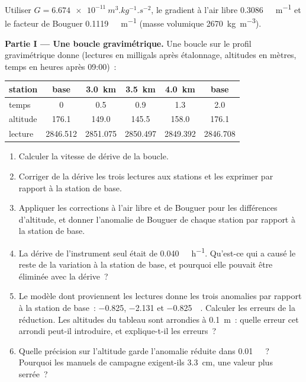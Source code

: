 \begin{problem}
\label{pb:b3:field-lab-methods-3:1}
Utiliser $G = \qty{6.674e-11}{m^3.kg^{-1}.s^{-2}}$, le gradient à
l'air libre \qty{0.3086}{\milli\gal.m^{-1}} et le facteur de Bouguer
\qty{0.1119}{\milli\gal.m^{-1}} (masse volumique \qty{2670}{kg.m^{-3}}).

\medskip\noindent\textbf{Partie I --- Une boucle gravimétrique.} Une boucle sur le
profil gravimétrique donne (lectures en milligals après étalonnage, altitudes
en mètres, temps en heures après 09:00)~:
\begin{center}
\small
\begin{tabular}{lccccc}
\hline
station & base & \qty{3.0}{km} & \qty{3.5}{km} & \qty{4.0}{km} & base \\
\hline
temps & 0 & 0.5 & 0.9 & 1.3 & 2.0 \\
altitude & 176.1 & 149.0 & 145.5 & 158.0 & 176.1 \\
lecture & 2846.512 & 2851.075 & 2850.497 & 2849.392 & 2846.708 \\
\hline
\end{tabular}
\end{center}
\begin{enumerate}
\item Calculer la vitesse de dérive de la boucle.
\item Corriger de la dérive les trois lectures aux stations et les exprimer
  par rapport à la station de base.
\item Appliquer les corrections à l'air libre et de Bouguer pour les
  différences d'altitude, et donner l'anomalie de Bouguer de chaque station par rapport à
  la station de base.
\item La dérive de l'instrument seul était de \qty{0.040}{\milli\gal.h^{-1}}.
  Qu'est-ce qui a causé le reste de la variation à la station de base, et pourquoi
  elle pouvait être éliminée avec la dérive~?
\item Le modèle dont proviennent les lectures donne les trois anomalies
  par rapport à la station de base~: \num{-0.825}, \num{-2.131} et
  \qty{-0.825}{\milli\gal}. Calculer les erreurs de la réduction. Les
  altitudes du tableau sont arrondies à \qty{0.1}{m}~: quelle erreur cet
  arrondi peut-il introduire, et explique-t-il les erreurs~?
\item Quelle précision sur l'altitude garde l'anomalie réduite dans
  \qty{0.01}{\milli\gal}~? Pourquoi les manuels de campagne exigent-ils
  \qty{3.3}{cm}, une valeur plus serrée~?
\end{enumerate}


\end{problem}
